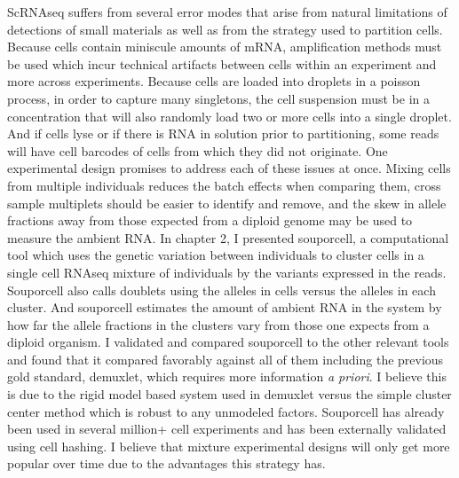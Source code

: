 \par{
ScRNAseq suffers from several error modes that arise from natural limitations of detections of small materials as well as from the strategy used to partition cells. Because cells contain miniscule amounts of mRNA, amplification methods must be used which incur technical artifacts between cells within an experiment and more across experiments. Because cells are loaded into droplets in a poisson process, in order to capture many singletons, the cell suspension must be in a concentration that will also randomly load two or more cells into a single droplet. And if cells lyse or if there is RNA in solution prior to partitioning, some reads will have cell barcodes of cells from which they did not originate. One experimental design promises to address each of these issues at once. Mixing cells from multiple individuals reduces the batch effects when comparing them, cross sample multiplets should be easier to identify and remove, and the skew in allele fractions away from those expected from a diploid genome may be used to measure the ambient RNA. In chapter 2, I presented souporcell, a computational tool which uses the genetic variation between individuals to cluster cells in a single cell RNAseq mixture of individuals by the variants expressed in the reads. Souporcell also calls doublets using the alleles in cells versus the alleles in each cluster. And souporcell estimates the amount of ambient RNA in the system by how far the allele fractions in the clusters vary from those one expects from a diploid organism. I validated and compared souporcell to the other relevant tools and found that it compared favorably against all of them including the previous gold standard, demuxlet, which requires more information \textit{a priori}. I believe this is due to the rigid model based system used in demuxlet versus the simple cluster center method which is robust to any unmodeled factors. Souporcell has already been used in several million+ cell experiments and has been externally validated using cell hashing. I believe that mixture experimental designs will only get more popular over time due to the advantages this strategy has. 
}

